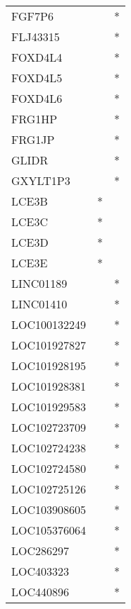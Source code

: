 \begin{longtable}{lcc}
FGF7P6             &                &          * \\
FLJ43315           &                &          * \\
FOXD4L4            &                &          * \\
FOXD4L5            &                &          * \\
FOXD4L6            &                &          * \\
FRG1HP             &                &          * \\
FRG1JP             &                &          * \\
GLIDR              &                &          * \\
GXYLT1P3           &                &          * \\
LCE3B              &              * &            \\
LCE3C              &              * &            \\
LCE3D              &              * &            \\
LCE3E              &              * &            \\
LINC01189          &                &          * \\
LINC01410          &                &          * \\
LOC100132249       &                &          * \\
LOC101927827       &                &          * \\
LOC101928195       &                &          * \\
LOC101928381       &                &          * \\
LOC101929583       &                &          * \\
LOC102723709       &                &          * \\
LOC102724238       &                &          * \\
LOC102724580       &                &          * \\
LOC102725126       &                &          * \\
LOC103908605       &                &          * \\
LOC105376064       &                &          * \\
LOC286297          &                &          * \\
LOC403323          &                &          * \\
LOC440896          &                &          * \\

\end{longtable}
